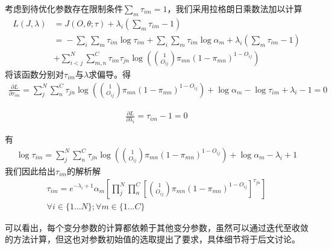 考虑到待优化参数存在限制条件$\sum_m \tau_{im} =1$，我们采用拉格朗日乘数法\cite{haj_stochastics_2019}加以计算
\begin{equation}\begin{aligned}
L(J,\lambda)&={}J(O,\theta;\tau)+\lambda_i(\sum_m \tau_{im}-1)\\
&={}-\sum_i\sum_m\tau_{im} \log \tau_{im} +\sum_i\sum_m \tau_{im} \log \alpha_m+\lambda_i(\sum_m \tau_{im}-1)\\ &+\sum_{i<j}^N\sum_{m,n}^C\tau_{im}\tau_{jn}\log ( \binom{1}{O_{ij}}\pi_{mn}(1-\pi_{mn})^{1-O_{ij}})
\end{aligned}\end{equation}
将该函数分别对$\tau_{im}$与$\lambda$求偏导。得
\begin{equation}\begin{aligned}
\frac{\partial L}{\partial \tau_{im}}=\sum_{j}^N\sum_{n}^C\tau_{jn}\log ( \binom{1}{O_{ij}}\pi_{mn}(1-\pi_{mn})^{1-O_{ij}})+\log \alpha_m -\log \tau_{im} +\lambda_i-1=0
\end{aligned}\end{equation}

\begin{equation}\begin{aligned}
\frac{\partial L}{\partial \lambda_i}=\tau_{im}-1=0
\end{aligned}\end{equation}

有
\begin{equation}\begin{aligned}
\log \tau_{im} =\sum_{j}^N\sum_{n}^C\tau_{jn}\log ( \binom{1}{O_{ij}}\pi_{mn}(1-\pi_{mn})^{1-O_{ij}})+\log \alpha_m -\lambda_i+1
\end{aligned}\end{equation}
我们因此给出$\tau_{im}$的解析解
\begin{equation}\begin{aligned}
\tau_{im} = e^{-\lambda_i+1}\alpha_m[\prod_j^N\prod_n^C[ \binom{1}{O_{ij}}\pi_{mn}(1-\pi_{mn})^{1-O_{ij}}]^{\tau_{jn}}]\\
\forall i \in \{1 ...N\} ;\forall m \in \{1 ... C\}
\end{aligned}\end{equation}

可以看出，每个变分参数的计算都依赖于其他变分参数，虽然可以通过迭代至收敛的方法计算，但这也对参数初始值的选取提出了要求，具体细节将于后文讨论。
